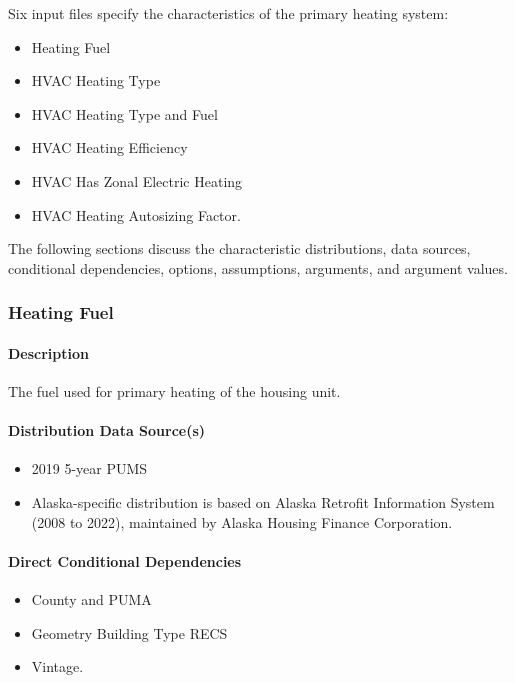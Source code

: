Six input files specify the characteristics of the primary heating system:
\begin{itemize}
    \item Heating Fuel
    \item HVAC Heating Type
    \item HVAC Heating Type and Fuel
    \item HVAC Heating Efficiency 
    \item HVAC Has Zonal Electric Heating
    \item HVAC Heating Autosizing Factor.
\end{itemize}

The following sections discuss the characteristic distributions, data sources, conditional dependencies, options, assumptions, arguments, and argument values.

\subsubsection{Heating Fuel}

\paragraph{Description}
The fuel used for primary heating of the housing unit.

\paragraph{Distribution Data Source(s)}
\begin{itemize}
    \item 2019 5-year PUMS 
    \item Alaska-specific distribution is based on Alaska Retrofit Information System (2008 to 2022), maintained by Alaska Housing Finance Corporation.
\end{itemize}

\paragraph{Direct Conditional Dependencies}
\begin{itemize}
    \item County and PUMA
    \item Geometry Building Type RECS
    \item Vintage.
\end{itemize}


